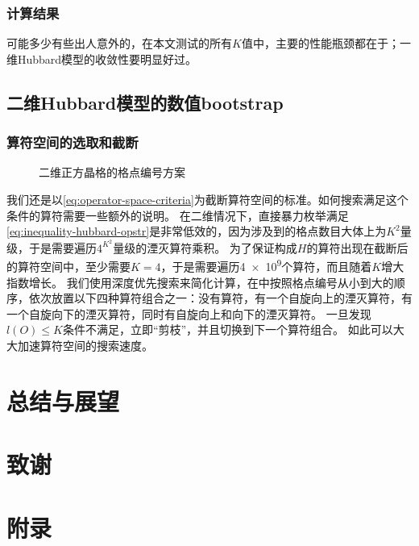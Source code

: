 \documentclass[oneside]{fduthesis}
\begin{document}
\subsection{计算结果}

可能多少有些出人意外的，在本文测试的所有$K$值中，主要的性能瓶颈都在于；一维Hubbard模型的收敛性要明显好过。

\section{二维Hubbard模型的数值bootstrap}

\subsection{算符空间的选取和截断}

\begin{figure}
    \centering
    
    \caption{二维正方晶格的格点编号方案}
    \label{fig:site-index-2d}
\end{figure}

我们还是以\eqref{eq:operator-space-criteria}为截断算符空间的标准。如何搜索满足这个条件的算符需要一些额外的说明。
在二维情况下，直接暴力枚举满足\eqref{eq:inequality-hubbard-opstr}是非常低效的，因为涉及到的格点数目大体上为$K^2$量级，于是需要遍历$4^{K^2}$量级的湮灭算符乘积。
为了保证构成$H$的算符出现在截断后的算符空间中，至少需要$K=4$，于是需要遍历\num{4e9}个算符，而且随着$K$增大指数增长。
我们使用深度优先搜索来简化计算，在中按照格点编号从小到大的顺序，依次放置以下四种算符组合之一：没有算符，有一个自旋向上的湮灭算符，有一个自旋向下的湮灭算符，同时有自旋向上和向下的湮灭算符。
一旦发现$l(O) \leq K$条件不满足，立即“剪枝”，并且切换到下一个算符组合。
如此可以大大加速算符空间的搜索速度。

\chapter{总结与展望}


\backmatter

\printbibliography

\chapter{致\quad 谢}

\chapter{附\quad 录}
\end{document}
